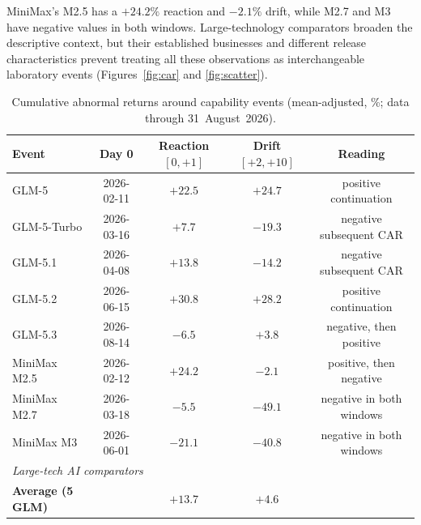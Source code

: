 \documentclass[11pt]{article}
\begin{document}
MiniMax's M2.5 has a $+24.2\%$ reaction and $-2.1\%$ drift, while M2.7 and M3 have negative values in both windows. Large-technology comparators broaden the descriptive context, but their established businesses and different release characteristics prevent treating all these observations as interchangeable laboratory events (Figures~\ref{fig:car} and \ref{fig:scatter}).

\begin{table}[H]
\centering
\caption{Cumulative abnormal returns around capability events (mean-adjusted, \%; data through
31~August~2026).}
\label{tab:car}
\scriptsize
\setlength{\tabcolsep}{4pt}
\renewcommand{\arraystretch}{0.82}
\begin{tabular}{lcccc}
\toprule
Event & Day 0 & Reaction $[0,+1]$ & Drift $[+2,+10]$ & Reading \\
\midrule
GLM-5 & 2026-02-11 & $+22.5$ & $+24.7$ & positive continuation \\
GLM-5-Turbo & 2026-03-16 & $+7.7$ & $-19.3$ & negative subsequent CAR \\
GLM-5.1 & 2026-04-08 & $+13.8$ & $-14.2$ & negative subsequent CAR \\
GLM-5.2 & 2026-06-15 & $+30.8$ & $+28.2$ & positive continuation \\
GLM-5.3 & 2026-08-14 & $-6.5$ & $+3.8$ & negative, then positive \\
\midrule
MiniMax M2.5 & 2026-02-12 & $+24.2$ & $-2.1$ & positive, then negative \\
MiniMax M2.7 & 2026-03-18 & $-5.5$ & $-49.1$ & negative in both windows \\
MiniMax M3 & 2026-06-01 & $-21.1$ & $-40.8$ & negative in both windows \\
\midrule
\multicolumn{5}{l}{\emph{Large-tech AI comparators}}\\

\textbf{Average (5 GLM)} & & $\mathbf{+13.7}$ & $\mathbf{+4.6}$ & \\
\bottomrule
\end{tabular}


\end{table}
\end{document}
